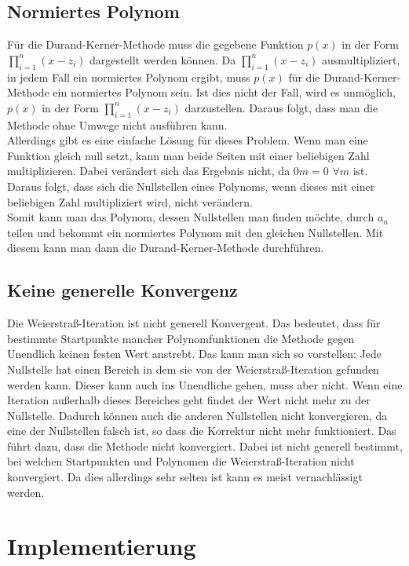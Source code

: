 \documentclass[12pt]{article}
\begin{document}
\subsection{Normiertes Polynom}
Für die Durand-Kerner-Methode muss die gegebene Funktion $p(x)$ in der Form $\prod_{i=1}^n (x-z_i)$ dargestellt werden können. Da $\prod_{i=1}^n (x-z_i)$ ausmultipliziert, in jedem Fall ein normiertes Polynom ergibt, muss $p(x)$ für die Durand-Kerner-Methode ein normiertes Polynom sein.
Ist dies nicht der Fall, wird es unmöglich, $p(x)$ in der Form $\prod_{i=1}^n (x-z_i)$ darzustellen. Daraus folgt, dass man die Methode ohne Umwege nicht ausführen kann. \\
Allerdings gibt es eine einfache Lösung für dieses Problem. Wenn man eine Funktion gleich null setzt, kann man beide Seiten mit einer beliebigen Zahl multiplizieren. Dabei verändert sich das Ergebnis nicht, da $0m = 0$ \space $\forall m$ ist. Daraus folgt, dass sich die Nullstellen eines Polynoms, wenn dieses mit einer beliebigen Zahl multipliziert wird, nicht verändern. \\
Somit kann man das Polynom, dessen Nullstellen man finden möchte, durch $a_n$ teilen und bekommt ein normiertes Polynom mit den gleichen Nullstellen. Mit diesem kann man dann die Durand-Kerner-Methode durchführen.

\subsection{Keine generelle Konvergenz}
Die Weierstraß-Iteration ist nicht generell Konvergent. Das bedeutet, dass für bestimmte Startpunkte mancher Polynomfunktionen die Methode gegen Unendlich keinen festen Wert anstrebt. Das kann man sich so vorstellen: Jede Nullstelle hat einen Bereich in dem sie von der Weierstraß-Iteration gefunden werden kann. Dieser kann auch ins Unendliche gehen, muss aber nicht. Wenn eine Iteration außerhalb dieses Bereiches geht findet der Wert nicht mehr zu der Nullstelle. Dadurch können auch die anderen Nullstellen nicht konvergieren, da eine der Nullstellen falsch ist, so dass die Korrektur nicht mehr funktioniert. Das führt dazu, dass die Methode nicht konvergiert. Dabei ist nicht generell bestimmt, bei welchen Startpunkten und Polynomen die Weierstraß-Iteration nicht konvergiert. Da dies allerdings sehr selten ist kann es meist vernachlässigt werden. 

\section{Implementierung}
\end{document}
